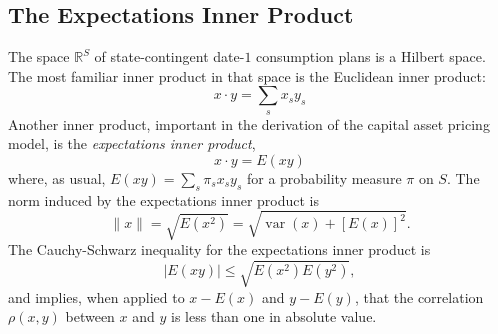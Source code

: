 \documentclass[\topdir/lecture\_notes.tex]{subfiles}
\begin{document}
\subsection{The Expectations Inner Product}
The space $\mathbb{R}^{S}$ of state-contingent date-$1$ consumption plans is a Hilbert space. The most familiar inner product in that space is the Euclidean inner product:
\begin{equation*}
x \cdot y=\sum_{s} x_{s} y_{s} 
\end{equation*}
Another inner product, important in the derivation of the capital asset pricing model, is the \emph{expectations inner product},
\begin{equation*}
x \cdot y=E(x y) \label{eq:expectations_inner_product} 
\end{equation*}
where, as usual, $E(x y)=\sum_{s} \pi_{s} x_{s} y_{s}$ for a probability measure $\pi$ on $S$. The norm induced by the expectations inner product is
\begin{equation*}
\|x\|=\sqrt{E\left(x^{2}\right)}=\sqrt{\operatorname{var}(x)+[E(x)]^{2}} . 
\end{equation*}
The Cauchy-Schwarz inequality for the expectations inner product is
\begin{equation*}
|E(x y)| \leq \sqrt{E\left(x^{2}\right) E\left(y^{2}\right)}, 
\end{equation*}
and implies, when applied to $x-E(x)$ and $y-E(y)$, that the correlation $\rho(x, y)$ between $x$ and $y$ is less than one in absolute value.
\end{document}
